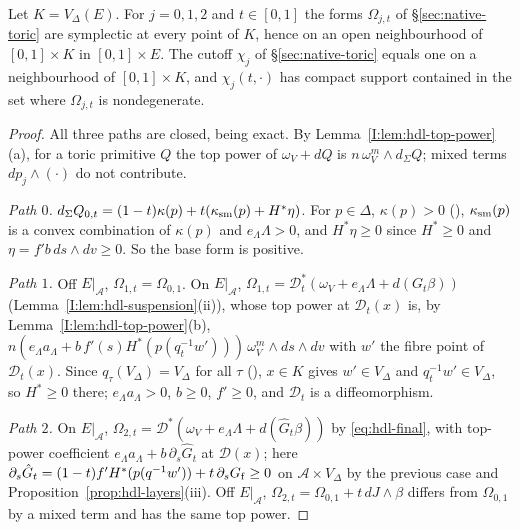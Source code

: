 \begin{lemma}\label{lem:shd-nbhd}
Let $K=V_\Delta(E)$. For $j=0,1,2$ and $t\in[0,1]$ the forms $\Omega_{j,t}$ of \S\ref{sec:native-toric} are symplectic at every
point of $K$, hence on an open neighbourhood of $[0,1]\times K$ in $[0,1]\times E$. The cutoff $\chi_j$ of
\S\ref{sec:native-toric} equals one on a neighbourhood of $[0,1]\times K$, and $\chi_j(t,\cdot)$ has compact support contained in
the set where $\Omega_{j,t}$ is nondegenerate.
\end{lemma}
\begin{proof}
All three paths are closed, being exact. By Lemma~\ref{I:lem:hdl-top-power}(a), for a toric primitive $Q$ the top power of
$\omega_V+dQ$ is $n\,\omega_V^m\wedge d_\Sigma Q$; mixed terms $dp_j\wedge(\cdot)$ do not contribute.

\emph{Path $0$.} $d_\Sigma Q_{0,t}=(1-t)\kappa(p)+t(\kappa_{\rm sm}(p)+H^*\eta)$. For $p\in\Delta$, $\kappa(p)>0$
(), $\kappa_{\rm sm}(p)$ is a convex combination of $\kappa(p)$ and $e_\Lambda\Lambda>0$, and
$H^*\eta\ge0$ since $H^*\ge0$ and $\eta=f'b\,ds\wedge dv\ge0$. So the base form is positive.

\emph{Path $1$.} Off $E|_{\mathcal A}$, $\Omega_{1,t}=\Omega_{0,1}$. On $E|_{\mathcal A}$, $\Omega_{1,t}=\mathcal D_t^*(\omega_V+e_\Lambda\Lambda+d(G_t\beta))$
(Lemma~\ref{I:lem:hdl-suspension}(ii)), whose top power at $\mathcal D_t(x)$ is, by Lemma~\ref{I:lem:hdl-top-power}(b),
$n(e_\Lambda a_\Lambda+b\,f'(s)H^*(p(q_t^{-1}w')))\,\omega_V^m\wedge ds\wedge dv$ with $w'$ the fibre point of $\mathcal D_t(x)$.
Since $q_\tau(V_\Delta)=V_\Delta$ for all $\tau$ (), $x\in K$ gives $w'\in V_\Delta$ and
$q_t^{-1}w'\in V_\Delta$, so $H^*\ge0$ there; $e_\Lambda a_\Lambda>0$, $b\ge0$, $f'\ge0$, and $\mathcal D_t$ is a diffeomorphism.

\emph{Path $2$.} On $E|_{\mathcal A}$, $\Omega_{2,t}=\mathcal D^*(\omega_V+e_\Lambda\Lambda+d(\hat G_t\beta))$ by \eqref{eq:hdl-final},
with top-power coefficient $e_\Lambda a_\Lambda+b\,\partial_s\hat G_t$ at $\mathcal D(x)$; here
$\partial_s\hat G_t=(1-t)f'H^*(p(q^{-1}w'))+t\,\partial_sG_{\rm f}\ge0$ on $\mathcal A\times V_\Delta$ by the previous case and
Proposition~\ref{prop:hdl-layers}(iii). Off $E|_{\mathcal A}$, $\Omega_{2,t}=\Omega_{0,1}+t\,dJ\wedge\beta$ differs from
$\Omega_{0,1}$ by a mixed term and has the same top power.


\end{proof}
